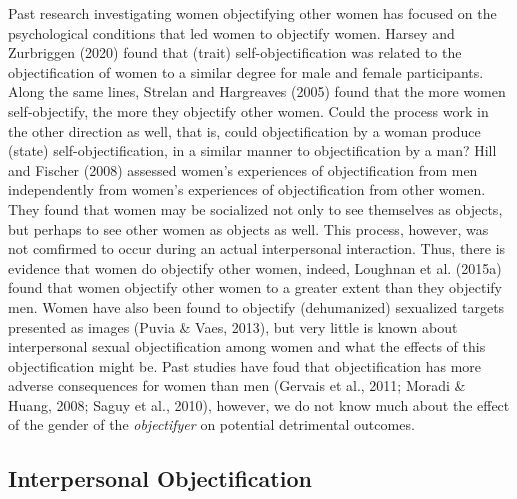 \documentclass[man]{apa6}
\begin{document}
Past research investigating women objectifying other women has focused
on the psychological conditions that led women to objectify women.
Harsey and Zurbriggen (2020) found that (trait) self-objectification was
related to the objectification of women to a similar degree for male and
female participants. Along the same lines, Strelan and Hargreaves (2005)
found that the more women self-objectify, the more they objectify other
women. Could the process work in the other direction as well, that is,
could objectification by a woman produce (state) self-objectification,
in a similar manner to objectification by a man? Hill and Fischer (2008)
assessed women's experiences of objectification from men independently
from women's experiences of objectification from other women. They found
that women may be socialized not only to see themselves as objects, but
perhaps to see other women as objects as well. This process, however,
was not comfirmed to occur during an actual interpersonal interaction.
Thus, there is evidence that women do objectify other women, indeed,
Loughnan et al. (2015a) found that women objectify other women to a
greater extent than they objectify men. Women have also been found to
objectify (dehumanized) sexualized targets presented as images (Puvia \&
Vaes, 2013), but very little is known about interpersonal sexual
objectification among women and what the effects of this objectification
might be. Past studies have foud that objectification has more adverse
consequences for women than men (Gervais et al., 2011; Moradi \& Huang,
2008; Saguy et al., 2010), however, we do not know much about the effect
of the gender of the \emph{objectifyer} on potential detrimental
outcomes.

\subsection{Interpersonal
Objectification}\label{interpersonal-objectification}
\end{document}
